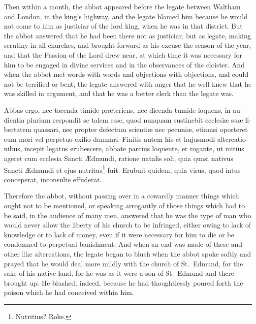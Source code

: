 \documentclass[10pt]{book}
\begin{document}
\begin{paracol}{2}
\switchcolumn

Then within a month, the abbot appeared before the legate between Waltham and London, in the king's highway, and the legate blamed him because he would not come to him as justiciar of the lord king, when he was in that district. But the abbot answered that he had been there not as justiciar, but as legate, making scrutiny in all churches, and brought forward as his excuse the season of the year, and that the Passion of the Lord drew near, at which time it was necessary for him to be engaged in divine services and in the observances of the cloister. And when the abbot met words with words and objections with objections, and could not be terrified or bent, the legate answered with anger that he well knew that he was skilled in argument, and that he was a better clerk than the legate was.

\switchcolumn*

\begin{otherlanguage}{latin}
Abbas ergo, nec tacenda timide pr\ae{}teriens, nec dicenda tumide loquens, in audientia plurium respondit se talem esse, quod nunquam sustinebit ecclesi\ae{} su\ae{} libertatem quassari, nec propter defectum scienti\ae{} nec pecuni\ae{}, etiamsi oporteret eum mori vel perpetuo exilio damnari. Finitis autem his et hujusmodi altercationibus, incepit legatus erubescere, abbate parcius loquente, et rogante, ut mitius ageret cum ecclesia Sancti \AE{}dmundi, ratione natalis soli, quia quasi nativus Sancti \AE{}dmundi et ejus nutritus\footnote[\textdagger]{Nutritius? Roke.} fuit. Erubuit quidem, quia virus, quod intus conceperat, inconsulte effuderat.
\end{otherlanguage}

\switchcolumn

Therefore the abbot, without passing over in a cowardly manner things which ought not to be mentioned, or speaking arrogantly of those things which had to be said, in the audience of many men, answered that he was the type of man who would never allow the liberty of his church to be infringed, either owing to lack of knowledge or to lack of money, even if it were necessary for him to die or be condemned to perpetual banishment. And when an end was made of these and other like altercations, the legate began to blush when the abbot spoke softly and prayed that he would deal more mildly with the church of St.\ Edmund, for the sake of his native land, for he was as it were a son of St.\ Edmund and there brought up. He blushed, indeed, because he had thoughtlessly poured forth the poison which he had conceived within him.


\end{paracol}
\end{document}
